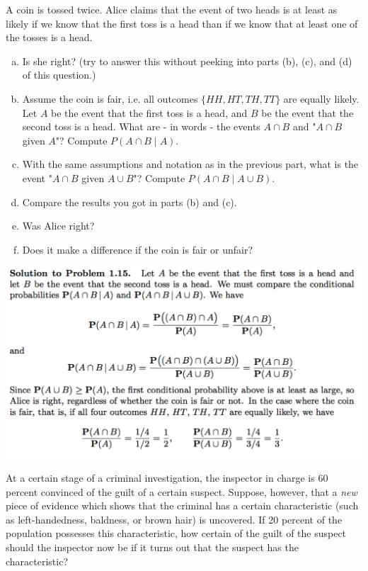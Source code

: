 \documentclass[12pt]{article}
\newenvironment{question}[2][Question]{\begin{trivlist}
\item[\hskip \labelsep {\bfseries #1}\hskip \labelsep {\bfseries #2.}]}{\end{trivlist}}
\begin{document}
 \begin{question}{2} A coin is tossed twice. Alice claims that the event of two heads is at least as likely if we know that 
 the first toss is a head than if we know that at least one of the tosses is a head. 
 \begin{enumerate}[(a)]
 \item  Is she right? (try to answer this without peeking into parts (b), (c), and (d) of this question.)
 \item Assume the coin is fair, i.e. all outcomes $\{HH, HT, TH, TT \}$ are equally likely. Let $A$ be the event that the first toss is a head, and $B$ be the event that the second toss is a head. What are - in words - the events $A \cap B$  and "$A \cap B$ given $A$"? Compute $P(A \cap B \mid A)$. 
 \item With the same assumptions and notation as in the previous part, what is the event  "$A \cap B$ given $A \cup B$"? Compute $P(A \cap B \mid A \cup B)$.
 \item Compare the results you got in parts (b) and (c).
 \item  Was Alice right? 
 \item Does it make a difference if the coin is fair or unfair?
 \end{enumerate}
\end{question} 

\includegraphics[scale=0.6]{Answer2}
 
\vspace{5mm}

 \begin{question}{3} At a certain stage of a criminal investigation, the inspector in charge is 60
  percent convinced
of the guilt of a certain suspect. Suppose, however, that a \emph{new} piece of evidence
which shows that the criminal has a certain characteristic (such as left-handedness,
baldness, or brown hair) is uncovered. If 20 percent of the population possesses this
characteristic, how certain of the guilt of the suspect should the inspector now be if it
turns out that the suspect has the characteristic?
\end{question} 
\end{document}
